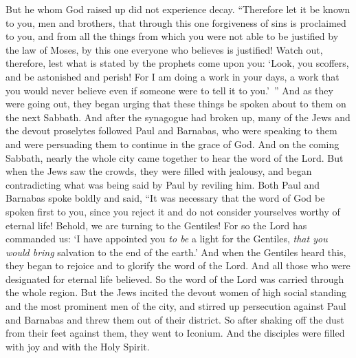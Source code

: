 \begin{biblechapter}
\verse But he whom God raised up did not experience decay.
\verse “Therefore let it be known to you, men and brothers, that through this one forgiveness of sins is proclaimed to you, and from all the things from which you were not able to be justified by the law of Moses,
\verse by this one everyone who believes is justified!
\verse Watch out, therefore, lest what is stated by the prophets come upon you:
\verse ‘Look, you scoffers, 
and be astonished and perish! 
For I am doing a work in your days, 
a work that you would never believe 
even if someone were to tell it to you.’ ”
 And as they were going out, they began urging that these things be spoken about to them on the next Sabbath.
\verse And after the synagogue had broken up, many of the Jews and the devout proselytes followed Paul and Barnabas, who were speaking to them and were persuading them to continue in the grace of God.
\verse And on the coming Sabbath, nearly the whole city came together to hear the word of the Lord.
\verse But when the Jews saw the crowds, they were filled with jealousy, and began contradicting what was being said by Paul by reviling him.
\verse Both Paul and Barnabas spoke boldly and said, “It was necessary that the word of God be spoken first to you, since you reject it and do not consider yourselves worthy of eternal life! Behold, we are turning to the Gentiles!
\verse For so the Lord has commanded us: ‘I have appointed you \textit{to be} a light for the Gentiles, 
\textit{that you would bring} salvation to the end of the earth.’
\verse And when the Gentiles heard this, they began to rejoice and to glorify the word of the Lord. And all those who were designated for eternal life believed.
\verse So the word of the Lord was carried through the whole region.
\verse But the Jews incited the devout women of high social standing and the most prominent men of the city, and stirred up persecution against Paul and Barnabas and threw them out of their district.
\verse So after shaking off the dust from their feet against them, they went to Iconium.
\verse And the disciples were filled with joy and with the Holy Spirit.
\end{biblechapter}

